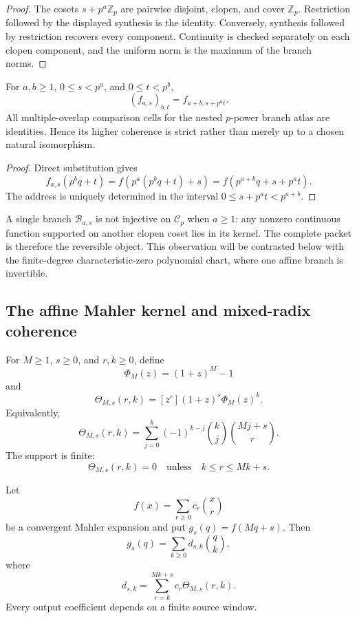 \begin{proof}
The cosets \(s+p^a\mathbb Z_p\) are pairwise disjoint, clopen, and cover \(\mathbb Z_p\).  Restriction followed by the displayed synthesis is the identity.  Conversely, synthesis followed by restriction recovers every component.  Continuity is checked separately on each clopen component, and the uniform norm is the maximum of the branch norms.
\end{proof}

\begin{theorem}
\label{thm:block08-nested-branches}
For \(a,b\geq1\), \(0\leq s<p^a\), and \(0\leq t<p^b\),
\[
 \boxed{(f_{a,s})_{b,t}=f_{a+b,s+p^a t}.}
\]
All multiple-overlap comparison cells for the nested \(p\)-power branch atlas are identities.  Hence its higher coherence is strict rather than merely up to a chosen natural isomorphism.
\end{theorem}

\begin{proof}
Direct substitution gives
\[
 f_{a,s}(p^bq+t)
 =f(p^a(p^bq+t)+s)
 =f(p^{a+b}q+s+p^a t).
\]
The address is uniquely determined in the interval \(0\leq s+p^a t<p^{a+b}\).
\end{proof}

A single branch \(\mathcal B_{a,s}\) is not injective on \(\mathcal C_p\) when \(a\geq1\): any nonzero continuous function supported on another clopen coset lies in its kernel.  The complete packet is therefore the reversible object.  This observation will be contrasted below with the finite-degree characteristic-zero polynomial chart, where one affine branch is invertible.

\subsection{The affine Mahler kernel and mixed-radix coherence}
\label{subsec:block08-affine-kernel}

For \(M\geq1\), \(s\geq0\), and \(r,k\geq0\), define
\[
 \Phi_M(z)=(1+z)^M-1
\]
and
\[
 \boxed{
 \Theta_{M,s}(r,k)
 =[z^r](1+z)^s\Phi_M(z)^k.}
\]
Equivalently,
\[
 \boxed{
 \Theta_{M,s}(r,k)
 =\sum_{j=0}^{k}(-1)^{k-j}\binom kj\binom{Mj+s}{r}.}
\]
The support is finite:
\[
 \Theta_{M,s}(r,k)=0
 \quad\text{unless}\quad
 k\leq r\leq Mk+s.
\]

\begin{theorem}
\label{thm:block08-affine-transfer}
Let
\[
 f(x)=\sum_{r\geq0}c_r\binom xr
\]
be a convergent Mahler expansion and put \(g_s(q)=f(Mq+s)\).  Then
\[
 g_s(q)=\sum_{k\geq0}d_{s,k}\binom qk,
\]
where
\[
 \boxed{
 d_{s,k}
 =\sum_{r=k}^{Mk+s}c_r\Theta_{M,s}(r,k).}
\]
Every output coefficient depends on a finite source window.
\end{theorem}

